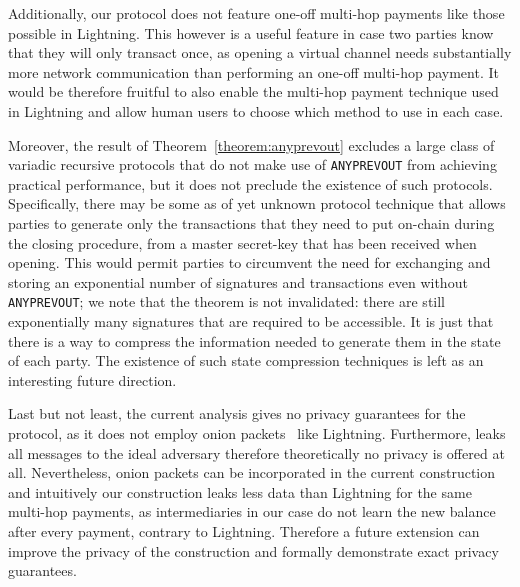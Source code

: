   Additionally, our protocol does not feature one-off multi-hop payments like
  those possible in Lightning. This however is a useful feature in case two
  parties know that they will only transact once, as opening a virtual channel
  needs substantially more network communication than performing an one-off
  multi-hop payment. It would be therefore fruitful to also enable the multi-hop
  payment technique used in Lightning and allow human users to choose which
  method to use in each case.

  Moreover, the result of Theorem~\ref{theorem:anyprevout} excludes a large
  class of variadic recursive protocols that do not make use of
  \texttt{ANYPREVOUT} from achieving practical performance, but it does not
  preclude the existence of such protocols. Specifically, there may be
  some as of yet unknown protocol technique that allows parties
  to generate only the transactions that they need to put on-chain during the
  closing procedure, from a master secret-key that has been received
  when opening. This would permit parties to circumvent the need for exchanging
  and storing an exponential number of signatures and transactions even without 
  \texttt{ANYPREVOUT}; we note that the theorem is not invalidated: there are still
  exponentially many signatures that are required to be accessible. It is just that 
  there is a way to compress the information needed to generate them in the state
  of each party. The existence of such state compression techniques is left as an 
  interesting future direction.

  Last but not least, the current analysis gives no privacy guarantees for the
  protocol, as it does not employ onion packets~\cite{sphinx} like Lightning.
  Furthermore, \fchan leaks all messages to the ideal adversary therefore
  theoretically no privacy is offered at all. Nevertheless, onion packets can be
  incorporated in the current construction and intuitively our construction
  leaks less data than Lightning for the same multi-hop payments, as
  intermediaries in our case do not learn the new balance after every payment,
  contrary to Lightning. Therefore a future extension can improve the privacy of
  the construction and formally demonstrate exact privacy guarantees.
